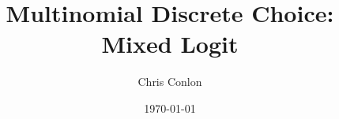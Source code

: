 \documentclass[xcolor=pdftex,dvipsnames,table,mathserif,aspectratio=169]{beamer}
\begin{document}
\title{Multinomial Discrete Choice: Mixed Logit}
\author{Chris Conlon}
\date{\today}

\frame{\titlepage}

%
\end{document}
